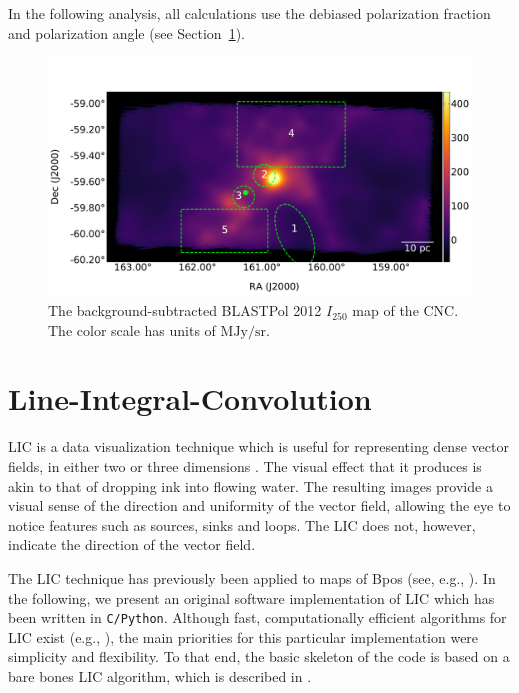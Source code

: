 In the following analysis, all calculations use the debiased polarization fraction and polarization angle (see Section~\ref{LIC}).

\begin{figure}[!htbp]
\centering
\includegraphics[width=\textwidth]{figures/carina/carina_I250}
\caption[~The background-subtracted BLASTPol 2012  map of the CNC.]{The background-subtracted BLASTPol 2012 $I_{250}$ map of the CNC. The color scale has units of $\mathrm{MJy}/\mathrm{sr}$.}
\label{fig:I250}
\end{figure}

\section{Line-Integral-Convolution}\label{LIC}

LIC is a data visualization technique which is useful for representing dense vector fields, in either two or three dimensions \citep{cabral1993imaging}. The visual effect that it produces is akin to that of dropping ink into flowing water. The resulting images provide a visual sense of the direction and uniformity of the vector field, allowing the eye to notice features such as sources, sinks and loops. The LIC does not, however, indicate the direction of the vector field.

The LIC technique has previously been applied to maps of \gls{Bpos} (see, e.g., \citet{ade2016planck}). In the following, we present an original software implementation of LIC which has been written in \texttt{C/Python}. Although fast, computationally efficient algorithms for LIC exist (e.g., \citet{stalling1995fast}), the main priorities for this particular implementation were simplicity and flexibility. To that end, the basic skeleton of the code is based on a bare bones LIC algorithm, which is described in \citet{ma1996texture}.


